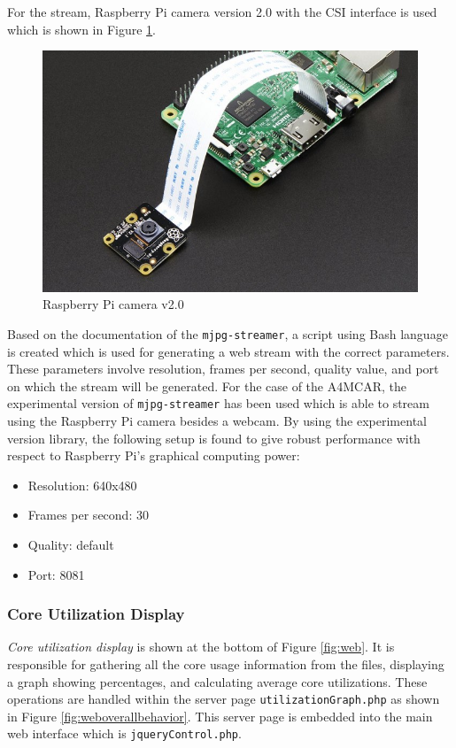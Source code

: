 For the stream, Raspberry Pi camera version 2.0 with the CSI interface is used which is shown in Figure \ref{fig:rpicam20}.

\begin{figure}[!ht]
	\centering
	\captionsetup{justification=centering}
	\includegraphics[scale=0.5]{content/images/rpicam20.jpg}
	\caption{Raspberry Pi camera v2.0}
	\label{fig:rpicam20}
\end{figure}

Based on the documentation of the \texttt{mjpg-streamer}, a script using Bash language is created which is used for generating a web stream with the correct parameters. These parameters involve resolution, frames per second, quality value, and port on which the stream will be generated. For the case of the A4MCAR, the experimental version of \texttt{mjpg-streamer} has been used which is able to stream using the Raspberry Pi camera besides a webcam. By using the experimental version library, the following setup is found to give robust performance with respect to Raspberry Pi's graphical computing power:
\begin{itemize}
	\item Resolution:        640x480
	\item Frames per second: 30
	\item Quality:           default
	\item Port:              8081
\end{itemize}
\subsubsection{Core Utilization Display}
\textit{Core utilization display} is shown at the bottom of Figure \ref{fig:web}. It is responsible for gathering all the core usage information from the files, displaying a graph showing percentages, and calculating average core utilizations. These operations are handled within the server page \texttt{utilizationGraph.php} as shown in Figure \ref{fig:weboverallbehavior}. This server page is embedded into the main web interface which is \texttt{jqueryControl.php}.

